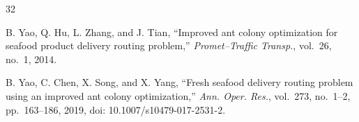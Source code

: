 \documentclass[lettersize,journal]{IEEEtran}
\begin{document}
\begin{thebibliography}{32}

B. Yao, Q. Hu, L. Zhang, and J. Tian, ``Improved ant colony optimization for seafood product delivery routing problem,'' \textit{Promet--Traffic Transp.}, vol.~26, no.~1, 2014.


B. Yao, C. Chen, X. Song, and X. Yang, ``Fresh seafood delivery routing problem using an improved ant colony optimization,'' \textit{Ann. Oper. Res.}, vol.~273, no.~1--2, pp.~163--186, 2019, doi: 10.1007/s10479-017-2531-2.

\end{thebibliography}
\end{document}

